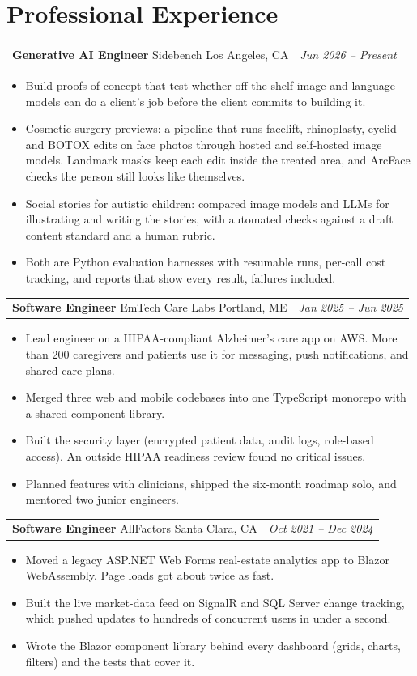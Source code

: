 \documentclass[letterpaper,11pt]{article}
\makeatletter
\newcommand{\experienceEntry}[4]{%
    \vspace{3pt}\noindent
    \begin{tabular*}{\textwidth}{@{}l@{\extracolsep{\fill}}r@{}}
        \textbf{\color{darktext}#1} {\color{lighttext}\textbar} {\color{accent}#2} {\color{lighttext}\textbar} {\color{lighttext}#3} & \textit{\color{lighttext}#4} \\
    \end{tabular*}\vspace{-4pt}
}
\makeatother
\begin{document}
\section{Professional Experience}

\experienceEntry{Generative AI Engineer}{Sidebench}{Los Angeles, CA}{Jun 2026 -- Present}
\begin{itemize}
    \item Build proofs of concept that test whether off-the-shelf image and language models can do a client's job before the client commits to building it.
    \item Cosmetic surgery previews: a pipeline that runs facelift, rhinoplasty, eyelid and BOTOX edits on face photos through hosted and self-hosted image models. Landmark masks keep each edit inside the treated area, and ArcFace checks the person still looks like themselves.
    \item Social stories for autistic children: compared image models and LLMs for illustrating and writing the stories, with automated checks against a draft content standard and a human rubric.
    \item Both are Python evaluation harnesses with resumable runs, per-call cost tracking, and reports that show every result, failures included.
\end{itemize}

\experienceEntry{Software Engineer}{EmTech Care Labs}{Portland, ME}{Jan 2025 -- Jun 2025}
\begin{itemize}
    \item Lead engineer on a HIPAA-compliant Alzheimer's care app on AWS. More than 200 caregivers and patients use it for messaging, push notifications, and shared care plans.
    \item Merged three web and mobile codebases into one TypeScript monorepo with a shared component library.
    \item Built the security layer (encrypted patient data, audit logs, role-based access). An outside HIPAA readiness review found no critical issues.
    \item Planned features with clinicians, shipped the six-month roadmap solo, and mentored two junior engineers.
\end{itemize}

\experienceEntry{Software Engineer}{AllFactors}{Santa Clara, CA}{Oct 2021 -- Dec 2024}
\begin{itemize}
    \item Moved a legacy ASP.NET Web Forms real-estate analytics app to Blazor WebAssembly. Page loads got about twice as fast.
    \item Built the live market-data feed on SignalR and SQL Server change tracking, which pushed updates to hundreds of concurrent users in under a second.
    \item Wrote the Blazor component library behind every dashboard (grids, charts, filters) and the tests that cover it.
\end{itemize}
\end{document}
